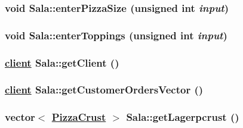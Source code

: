 \hypertarget{class_sala_caeeb8aada209ebb8bde4749b2ececdc}{
\subsubsection[enterPizzaSize]{\setlength{\rightskip}{0pt plus 5cm}void Sala::enter\-Pizza\-Size (unsigned int {\em input})}}
\label{class_sala_caeeb8aada209ebb8bde4749b2ececdc}


\hypertarget{class_sala_34479ade70e563ba9c7eb9b66df2270e}{
\subsubsection[enterToppings]{\setlength{\rightskip}{0pt plus 5cm}void Sala::enter\-Toppings (unsigned int {\em input})}}
\label{class_sala_34479ade70e563ba9c7eb9b66df2270e}


\hypertarget{class_sala_a1300ce1d3137fc3bd1b2938612faa1b}{
\subsubsection[getClient]{\setlength{\rightskip}{0pt plus 5cm}\hyperlink{classclient}{client} Sala::get\-Client ()}}
\label{class_sala_a1300ce1d3137fc3bd1b2938612faa1b}


\hypertarget{class_sala_3a31e5a83058a950f863932d3ecaef2e}{
\subsubsection[getCustomerOrdersVector]{\setlength{\rightskip}{0pt plus 5cm}\hyperlink{classclient}{client} Sala::get\-Customer\-Orders\-Vector ()}}
\label{class_sala_3a31e5a83058a950f863932d3ecaef2e}


\hypertarget{class_sala_85a631cad1f4009e87de7da3bc52174c}{
\subsubsection[getLagerpcrust]{\setlength{\rightskip}{0pt plus 5cm}vector$<$ \hyperlink{class_pizza_crust}{Pizza\-Crust} $>$ Sala::get\-Lagerpcrust ()}}
\label{class_sala_85a631cad1f4009e87de7da3bc52174c}



